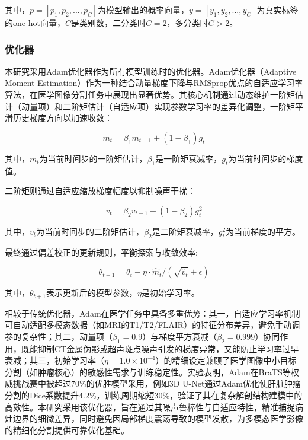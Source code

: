 其中，$p=[p_1,p_2,...,p_C]$为模型输出的概率向量，$y=[y_1,y_2,...,y_C]$为真实标签的one-hot向量，$C$是类别数，二分类时$C=2$，多分类时$C>2$。

\subsubsection{优化器}

本研究采用Adam优化器作为所有模型训练时的优化器。Adam优化器（Adaptive Moment Estimation）作为一种结合动量梯度下降与RMSprop优点的自适应学习率算法，在医学图像分割任务中展现出显著优势。其核心机制通过动态维护一阶矩估计（动量项）和二阶矩估计（自适应项）实现参数学习率的差异化调整，一阶矩平滑历史梯度方向以加速收敛：

\begin{equation}
    m_t = \beta_1 m_{t-1} + (1 - \beta_1) g_t
\end{equation}

其中，$m_t$为当前时间步的一阶矩估计，$\beta_1$是一阶矩衰减率，$g_t$为当前时间步的梯度值。

二阶矩则通过自适应缩放梯度幅度以抑制噪声干扰：

\begin{equation}
    v_t = \beta_2 v_{t-1} + (1 - \beta_2) g_t^2
\end{equation}

其中，$v_t$为当前时间步的二阶矩估计，$\beta_2$是二阶矩衰减率，$g_t^2$为当前梯度的平方。

最终通过偏差校正的更新规则，平衡探索与收敛效率:

\begin{equation}
    \theta_{t+1} = \theta_t - \eta \cdot \hat{m}_t / (\sqrt{\hat{v}_t} + \epsilon)
\end{equation}

其中，$\theta_{t+1}$表示更新后的模型参数，$\eta$是初始学习率。

相较于传统优化器，Adam在医学任务中具备多重优势：其一，自适应学习率机制可自动适配多模态数据（如MRI的T1/T2/FLAIR）的特征分布差异，避免手动调参的复杂性；其二，动量项（\( \beta_1=0.9 \)）与梯度平方衰减（\( \beta_2=0.999 \)）协同作用，既能抑制CT金属伪影或超声斑点噪声引发的梯度异常，又能防止学习率过早衰减；其三，初始学习率（\( \eta=1.0 \times 10^{-4} \)）的精细设定兼顾了医学图像中小目标分割（如肿瘤核心）的敏感性需求与训练稳定性。实验表明，Adam在BraTS等权威挑战赛中被超过70\%的优胜模型采用，例如3D U-Net通过Adam优化使肝脏肿瘤分割的Dice系数提升4.2\%，训练周期缩短30\%，验证了其在复杂解剖结构建模中的高效性。本研究采用该优化器，旨在通过其噪声鲁棒性与自适应特性，精准捕捉病灶边界的细微差异，同时避免因局部梯度震荡导致的模型发散，为多模态医学影像的精细化分割提供可靠优化基础。

